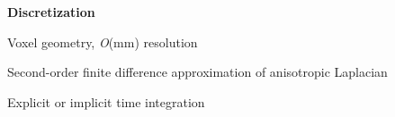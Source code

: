 \documentclass[20pt]{ICSPoster}
\begin{document}
\begin{posterbox}[2]
\begin{headerbox}[
        title=Modeling Aspects,
        width=0.47\textwidth,
        height=0.25\textheight]
\begin{minipage}{0.50\textwidth}
        \vspace{0.5cm}

        \textbf{Discretization}
        \vspace{1mm}
        \begin{compactitem}
          \item Voxel geometry, \textit{O}(mm) resolution
          \item Second-order finite difference approximation of anisotropic Laplacian
          \item Explicit or implicit time integration
        \end{compactitem}

      \end{minipage}
    \end{headerbox}
  \end{posterbox}
\end{document}
